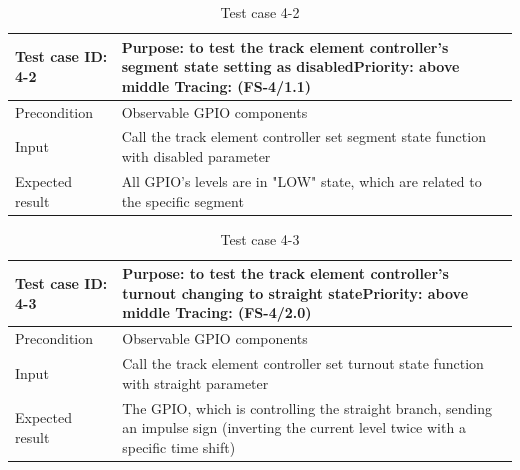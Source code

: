 \begin{table}[H]
	\caption{Test case 4-2}
	\label{table:TCase-FS4-2}
	\begin{center}
		\renewcommand{\arraystretch}{1.8}
		\begin{tabu} 
			to 0.9 \textwidth
			{  X[0.4, c] X[c] }
			\toprule
			Test case ID: 4-2 & Purpose: to test the track element controller's segment state setting as disabled\newline Priority: above middle \newline Tracing: (FS-4/1.1)\\ \midrule
			Precondition & Observable GPIO components \\
			Input & Call the track element controller set segment state function with disabled parameter  \\
			Expected result & All GPIO's levels are in "LOW" state, which are related to the specific segment \\ \bottomrule
		\end{tabu}
	\end{center}
\end{table} 

\begin{table}[H]
	\caption{Test case 4-3}
	\label{table:TCase-FS4-3}
	\begin{center}
		\renewcommand{\arraystretch}{1.8}
		\begin{tabu} 
			to 0.9 \textwidth
			{  X[0.4, c] X[c] }
			\toprule
			Test case ID: 4-3 & Purpose: to test the track element controller's turnout changing to straight state\newline Priority: above middle \newline Tracing: (FS-4/2.0)\\ \midrule
			Precondition & Observable GPIO components \\
			Input & Call the track element controller set turnout state function with straight parameter  \\
			Expected result & The GPIO, which is controlling the straight branch, sending an impulse sign (inverting the current level twice with a specific time shift) \\ \bottomrule
		\end{tabu}
	\end{center}
\end{table}

